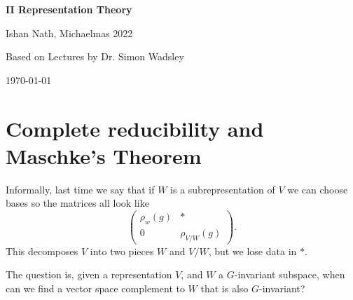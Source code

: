 \documentclass[12pt]{article}
\theoremstyle{definition}
\theoremstyle{remark}
\begin{document}
\hypersetup{pageanchor=false}
\begin{titlepage}
	\begin{center}
		\vspace*{1em}
		\Huge
		\textbf{II Representation Theory}

		\vspace{1em}
		\large
		Ishan Nath, Michaelmas 2022

		\vspace{1.5em}

		\Large

		Based on Lectures by Dr. Simon Wadsley

		\vspace{1em}

		\large
		\today
	\end{center}
	
\end{titlepage}
\hypersetup{pageanchor=true}

\tableofcontents

\newpage

\section{Complete reducibility and Maschke's Theorem}%
\label{sec:complete_reducibility_and_maschke_s_theorem}

Informally, last time we say that if $W$ is a subrepresentation of $V$ we can choose bases so the matrices all look like
\[
\begin{pmatrix}
	\rho_w(g) & \ast \\
	0 & \rho_{V/W}(g)
\end{pmatrix}
.\]
This decomposes $V$ into two pieces $W$ and $V/W$, but we lose data in $\ast$.

The question is, given a representation $V$, and $W$ a $G$-invariant subspace, when can we find a vector space complement to $W$ that is also $G$-invariant?
\end{document}
